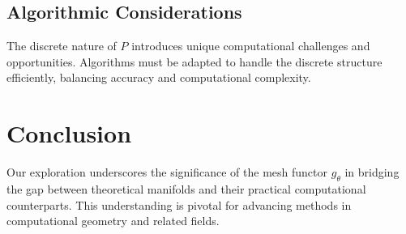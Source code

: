\documentclass{article}
\begin{document}
\subsection{Algorithmic Considerations}
The discrete nature of \( P \) introduces unique computational challenges and opportunities. Algorithms must be adapted to handle the discrete structure efficiently, balancing accuracy and computational complexity.\autocite{coeurjolly2001DiscreteCurvatureBased}

\section{Conclusion}
Our exploration underscores the significance of the mesh functor \( g_\theta \) in bridging the gap between theoretical manifolds and their practical computational counterparts. This understanding is pivotal for advancing methods in computational geometry and related fields.
\autocite{wu2020DeltaGradRapidRetraining}

\printbibliography
\end{document}
